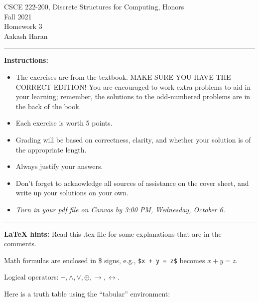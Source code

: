 \documentclass[12pt]{article}  %
\newcommand{\NOT}{\neg}
\newcommand{\AND}{\wedge}
\newcommand{\OR}{\vee}
\newcommand{\XOR}{\oplus}
\newcommand{\IMPLIES}{\rightarrow}
\newcommand{\IFF}{\leftrightarrow}
\begin{document}
\begin{center}         %
{\large                %
CSCE 222-200, Discrete Structures for Computing, Honors \\  %
Fall 2021 \\
Homework 3 \\
Aakash Haran}
\end{center}


\rule{6in}{.1pt}       %
                    
\noindent              %
{\bf Instructions:}    %

\begin{itemize}        %
\item The exercises are from the textbook.  MAKE SURE YOU HAVE THE CORRECT
      EDITION!  You are encouraged to work
      extra problems to aid in your learning; remember, the solutions to 
      the odd-numbered problems are in the back of the book.
\item Each exercise is worth 5 points.
\item Grading will be based on correctness, clarity, and whether your
      solution is of the appropriate length.
\item Always justify your answers.
\item Don't forget to acknowledge all sources of assistance on the cover
      sheet, and write up your solutions on your own.
\item {\em Turn in your pdf file on Canvas by 3:00 PM, Wednesday, October 6.}
\end{itemize}

\rule{6in}{.1pt}       %

\noindent
{\bf LaTeX hints:}  Read this .tex file for some explanations that are in
the comments.

Math formulas are enclosed in \$ signs, e.g., {\tt \$x + y = z\$}
becomes $x + y = z$.

Logical operators: $\NOT, \AND, \OR, \XOR, \IMPLIES, \IFF$.

Here is a truth table using the ``tabular'' environment:
\end{document}
